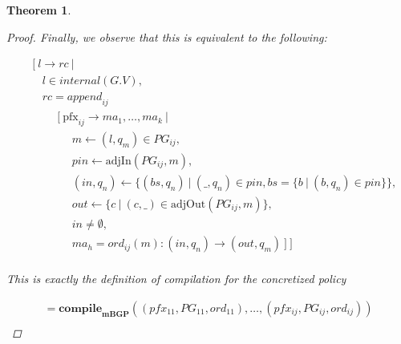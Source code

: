 \documentclass[twocolumn, openany]{sig-alternate-10pt}
\newcommand{\Pfx}{\mathrm{pfx}}%
\newtheorem{thm}{Theorem}
\begin{document}
\begin{thm}
\begin{proof}
  Finally, we observe that this is equivalent to the following:

  \[ \begin{array}{l}
     ~~~~~ [~ l \rightarrow rc ~\vert~ \\
     ~~~~~~~~~ l \in internal(G.V), \\
     ~~~~~~~~~ rc = \mathit{append}_{ij}~  \\
     ~~~~~~~~~~~~~~~ [~ \Pfx_{ij} \rightarrow ma_1, \dots, ma_k ~\vert~ \\
     ~~~~~~~~~~~~~~~~~~~~~ m \leftarrow (l,q_m) \in PG_{ij}, \\
     ~~~~~~~~~~~~~~~~~~~~~ pin \leftarrow \text{adjIn}(PG_{ij},m), \\
     ~~~~~~~~~~~~~~~~~~~~~ (in,q_n) \leftarrow \{ (bs,q_n) ~\vert~ (\_,q_n) \in pin, bs=\{b ~\vert~ (b,q_n) \in pin \} \}, \\
     ~~~~~~~~~~~~~~~~~~~~~ out \leftarrow \{ c ~\vert~ (c,\_) \in \text{adjOut}(PG_{ij},m) \}, \\
     ~~~~~~~~~~~~~~~~~~~~~ in \neq \emptyset, \\
     ~~~~~~~~~~~~~~~~~~~~~ ma_h = ord_{ij}(m) : (in,q_n) \rightarrow (out,q_m) ~] ~] \\
  \end{array} \]%

  This is exactly the definition of compilation for the concretized policy

  \[ \begin{array}{l}
     = \textbf{compile}_\textbf{mBGP}( (pfx_{11},PG_{11},ord_{11}), \dots, (pfx_{ij},PG_{ij},ord_{ij}) ) \\
  \end{array} \]%


  \end{proof}

\end{thm}
\end{document}
